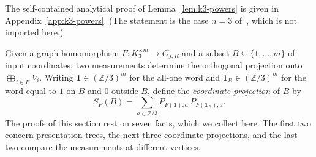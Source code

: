 The self-contained analytical proof of Lemma~\ref{lem:k3-powers} is given in Appendix~\ref{app:k3-powers}. (The statement is the case $n=3$ of~\cite[Theorem~7.1]{CvdDZ}, which is not imported here.)

Given a graph homomorphism $F:K_3^{\times m}\to G_{j,R}$ and a subset $B\subseteq\{1,\ldots,m\}$ of input coordinates, two measurements determine the orthogonal projection onto $\bigoplus_{i\in B} V_i$. Writing $\mathbf 1\in(\mathbb Z/3)^m$ for the all-one word and $\mathbf 1_B\in(\mathbb Z/3)^m$ for the word equal to $1$ on $B$ and $0$ outside $B$, define the \emph{coordinate projection} of $B$ by
\begin{equation}\label{eq:coordinate-projection}
 S_F(B)=\sum_{a\in\mathbb Z/3} P_{F(\mathbf 1),a}\,P_{F(\mathbf 1_B),a}.
\end{equation}
The proofs of this section rest on seven facts, which we collect here. The first two concern presentation trees, the next three coordinate projections, and the last two compare the measurements at different vertices.
